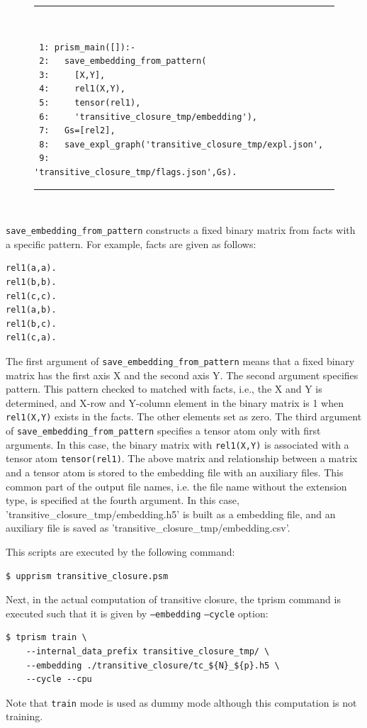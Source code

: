 \documentclass[a4paper]{report}
\begin{document}
\begin{figure}[h]
	\rule{0.85\textwidth}{0.10mm}\\ [-1em]
	\begin{verbatim}
 1: prism_main([]):- 
 2:   save_embedding_from_pattern(
 3:     [X,Y],
 4:     rel1(X,Y),
 5:     tensor(rel1),
 6:     'transitive_closure_tmp/embedding'),
 7:   Gs=[rel2],
 8:   save_expl_graph('transitive_closure_tmp/expl.json',
 9:                   'transitive_closure_tmp/flags.json',Gs).
	\end{verbatim}
	\rule{0.85\textwidth}{0.10mm}\\ [-1em]
\end{figure}



{\tt save\_embedding\_from\_pattern}
constructs a fixed binary matrix from facts with a specific pattern.
For example, facts are given as follows:
\begin{verbatim}
rel1(a,a).
rel1(b,b).
rel1(c,c).
rel1(a,b).
rel1(b,c).
rel1(c,a).
\end{verbatim}

The first argument of {\tt save\_embedding\_from\_pattern} means that a fixed binary matrix has the first axis X and the second axis Y.
The second argument specifies pattern.
This pattern checked to matched with facts, i.e., the X and Y is determined, and 
X-row and Y-column element in the binary matrix is 1 when {\tt rel1(X,Y)} exists in the facts.
The other elements set as zero. 
The third argument of {\tt save\_embedding\_from\_pattern} specifies a tensor atom only with first arguments. In this case, the binary matrix with {\tt rel1(X,Y)} is associated with a tensor atom {\tt tensor(rel1)}.
The above matrix and relationship between a matrix and a tensor atom is stored to the embedding file with an auxiliary files.
This common part of the output file names, i.e. the file name without  the extension type, is specified at the fourth argument.
In this case, 'transitive\_closure\_tmp/embedding.h5' is built as a embedding file, and an auxiliary file is saved as 'transitive\_closure\_tmp/embedding.csv'.

This scripts are executed by the following command: 
\begin{verbatim}
$ upprism transitive_closure.psm
\end{verbatim}

Next, in the actual computation of transitive closure, the tprism command is executed such that it is given by {\tt --embedding}  {\tt --cycle} option:
\begin{verbatim}
$ tprism train \
    --internal_data_prefix transitive_closure_tmp/ \
    --embedding ./transitive_closure/tc_${N}_${p}.h5 \
    --cycle --cpu
\end{verbatim}
Note that {\tt train} mode is used as dummy mode although this computation is not training.
\end{document}
